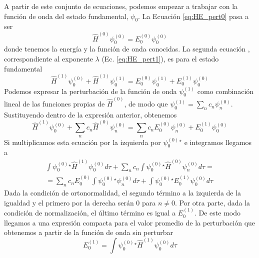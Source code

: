 A partir de este conjunto de ecuaciones, podemos empezar a trabajar
con la función de onda del estado fundamental, $\psi_0$. La Ecuación
\ref{eq:HE_pert0} pasa a ser
\begin{equation}
    \hat{H}^{(0)}\psi_0^{(0)} = E_0^{(0)}\psi_0^{(0)}
\end{equation}
donde tenemos la energía y la función de onda conocidas. La segunda ecuación
, correspondiente al exponente $\lambda$ (Ec. \ref{eq:HE_pert1}), 
es para el estado fundamental
\begin{equation}
    \hat{H}^{(1)}\psi_0^{(0)} + \hat{H}^{(1)}\psi_0^{(1)} = 
    E_0^{(0)}\psi_0^{(1)} + E_0^{(1)}\psi_0^{(0)}
\end{equation}
Podemos expresar la perturbación de la función de onda $\psi_0^{(1)}$ 
como combinación lineal de las funciones propias de $\hat{H}^{(0)}$,
de modo que $\psi_0^{(1)}=\sum_nc_n\psi_n^{(0)}$. Sustituyendo
dentro de la expresión anterior, obtenemos
\begin{equation}
    \hat{H}^{(1)}\psi_0^{(0)} + \sum_nc_n\hat{H}^{(0)}\psi_n^{(0)} = 
    \sum_nc_nE_0^{(0)}\psi_n^{(0)} + E_0^{(1)}\psi_0^{(0)}
\end{equation}
Si multiplicamos esta ecuación por la izquierda por $\psi_0^{(0)}^\star$
e integramos llegamos a
\begin{equation}
\begin{split}
  \int \psi_0^{(0)}^\star \hat{H}^{(1)}\psi_0^{(0)}d\tau +  \sum_nc_n\int \psi_0^{(0)}^\star\hat{H}^{(0)}\psi_n^{(0)}d\tau = \\
    = \sum_nc_nE_0^{(0)}\int \psi_0^{(0)}^\star\psi_n^{(0)}d\tau + \int \psi_0^{(0)}^\star E_0^{(1)}\psi_0^{(0)}d\tau
\end{split}
\end{equation}
Dada la condición de ortonormalidad, el segundo término a la izquierda de
la igualdad y el primero por la derecha serán $0$ para $n\neq 0$. Por otra
parte, dada la condición de normalización, el último término es igual a 
$E_0^{(1)}$. De este modo llegamos a una expresión compacta para el
valor promedio de la perturbación que obtenemos a partir de la función 
de onda sin perturbar
\begin{equation}
    E_0^{(1)}= \int \psi_0^{(0)}^\star \hat{H}^{(1)}\psi_0^{(0)}d\tau 
\end{equation}

